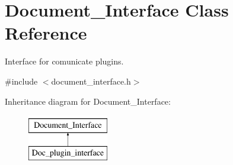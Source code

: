 \hypertarget{classDocument__Interface}{\section{Document\-\_\-\-Interface Class Reference}
\label{classDocument__Interface}
}


Interface for comunicate plugins.  




{\ttfamily \#include $<$document\-\_\-interface.\-h$>$}

Inheritance diagram for Document\-\_\-\-Interface\-:\begin{figure}[H]
\begin{center}
\leavevmode
\includegraphics[height=2.000000cm]{classDocument__Interface}
\end{center}
\end{figure}
